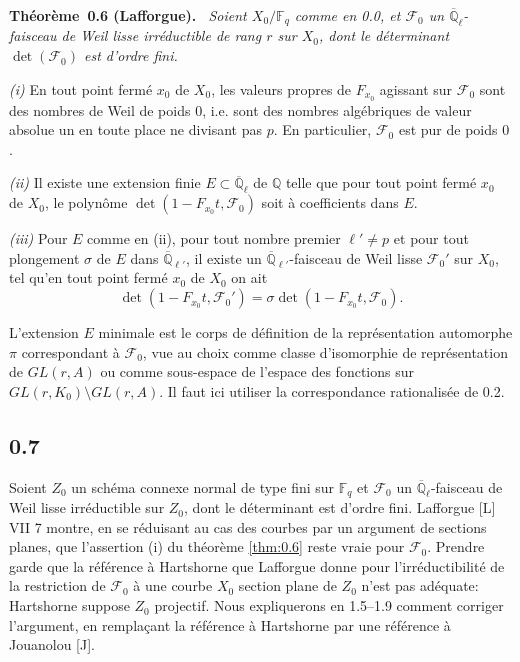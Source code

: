 \documentclass[11pt,a4paper]{article}
\makeatletter
\theoremstyle{plain}
\theoremstyle{definition}
\newenvironment{manualblock}[4]{%
  \par\medskip\noindent\textbf{#1~#2#3.}\def\@currentlabel{#2}\label{#4}\itshape\ }{\par\normalfont\medskip}
\makeatother
\begin{document}
\begin{manualblock}{Théorème}{0.6}{ (Lafforgue)}{thm:0.6}
Soient $X_0/\mathbb{F}_q$ comme en 0.0, et $\mathcal{F}_0$ un $\overline{\mathbb{Q}}_\ell$-faisceau de Weil lisse irr\'eductible de rang $r$ sur $X_0$, dont le d\'eterminant $\det(\mathcal{F}_0)$ est d'ordre fini.

\emph{(i)} En tout point ferm\'e $x_0$ de $X_0$, les valeurs propres de $F_{x_0}$ agissant sur $\mathcal{F}_0$ sont des nombres de Weil de poids $0$, i.e. sont des nombres alg\'ebriques de valeur absolue un en toute place ne divisant pas $p$. En particulier, $\mathcal{F}_0$ est pur de poids $0$.

\emph{(ii)} Il existe une extension finie $E \subset \overline{\mathbb{Q}}_\ell$ de $\mathbb{Q}$ telle que pour tout point ferm\'e $x_0$ de $X_0$, le polyn\^ome $\det(1 - F_{x_0}t, \mathcal{F}_0)$ soit \`a coefficients dans $E$.

\emph{(iii)} Pour $E$ comme en (ii), pour tout nombre premier $\ell' \neq p$ et pour tout plongement $\sigma$ de $E$ dans $\overline{\mathbb{Q}}_{\ell'}$, il existe un $\overline{\mathbb{Q}}_{\ell'}$-faisceau de Weil lisse $\mathcal{F}_0'$ sur $X_0$, tel qu'en tout point ferm\'e $x_0$ de $X_0$ on ait
\[
\det(1 - F_{x_0}t, \mathcal{F}_0') = \sigma \det(1 - F_{x_0}t, \mathcal{F}_0).
\]
\end{manualblock}

L'extension $E$ minimale est le corps de d\'efinition de la repr\'esentation automorphe $\pi$ correspondant \`a $\mathcal{F}_0$, vue au choix comme classe d'isomorphie de repr\'esentation de $GL(r,A)$ ou comme sous-espace de l'espace des fonctions sur $GL(r,K_0) \setminus GL(r,A)$. Il faut ici utiliser la correspondance rationalis\'ee de 0.2.

\subsection*{0.7}

Soient $Z_0$ un sch\'ema connexe normal de type fini sur $\mathbb{F}_q$ et $\mathcal{F}_0$ un $\overline{\mathbb{Q}}_\ell$-faisceau de Weil lisse irr\'eductible sur $Z_0$, dont le d\'eterminant est d'ordre fini. Lafforgue [L] VII 7 montre, en se r\'eduisant au cas des courbes par un argument de sections planes, que l'assertion (i) du th\'eor\`eme \ref{thm:0.6} reste vraie pour $\mathcal{F}_0$. Prendre garde que la r\'ef\'erence \`a Hartshorne que Lafforgue donne pour l'irr\'eductibilit\'e de la restriction de $\mathcal{F}_0$ \`a une courbe $X_0$ section plane de $Z_0$ n'est pas ad\'equate: Hartshorne suppose $Z_0$ projectif. Nous expliquerons en 1.5--1.9 comment corriger l'argument, en rempla\c{c}ant la r\'ef\'erence \`a Hartshorne par une r\'ef\'erence \`a Jouanolou [J].
\end{document}
